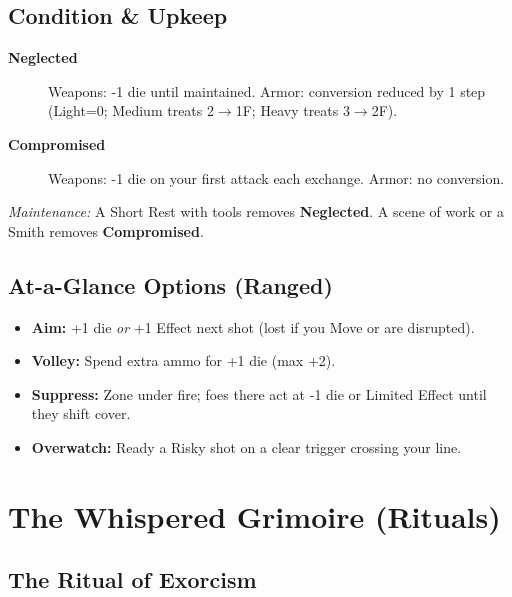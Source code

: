 \section{Condition \& Upkeep}
\label{app:condition}
\begin{description}
  \item[\textbf{Neglected}] Weapons: -1 die until maintained. Armor: conversion reduced by 1 step (Light=0; Medium treats 2$\rightarrow$1F; Heavy treats 3$\rightarrow$2F).
  \item[\textbf{Compromised}] Weapons: -1 die on your first attack each exchange. Armor: no conversion.
\end{description}
\noindent\emph{Maintenance:} A Short Rest with tools removes \textbf{Neglected}. A scene of work or a Smith removes \textbf{Compromised}.

\section{At-a-Glance Options (Ranged)}
\label{app:ranged-at-a-glance}
\begin{itemize}
  \item \textbf{Aim:} +1 die \emph{or} +1 Effect next shot (lost if you Move or are disrupted).
  \item \textbf{Volley:} Spend extra ammo for +1 die (max +2).
  \item \textbf{Suppress:} Zone under fire; foes there act at -1 die or Limited Effect until they shift cover.
  \item \textbf{Overwatch:} Ready a Risky shot on a clear trigger crossing your line.
\end{itemize}


\clearpage

\chapter{The Whispered Grimoire (Rituals)}

\section*{The Ritual of Exorcism}


